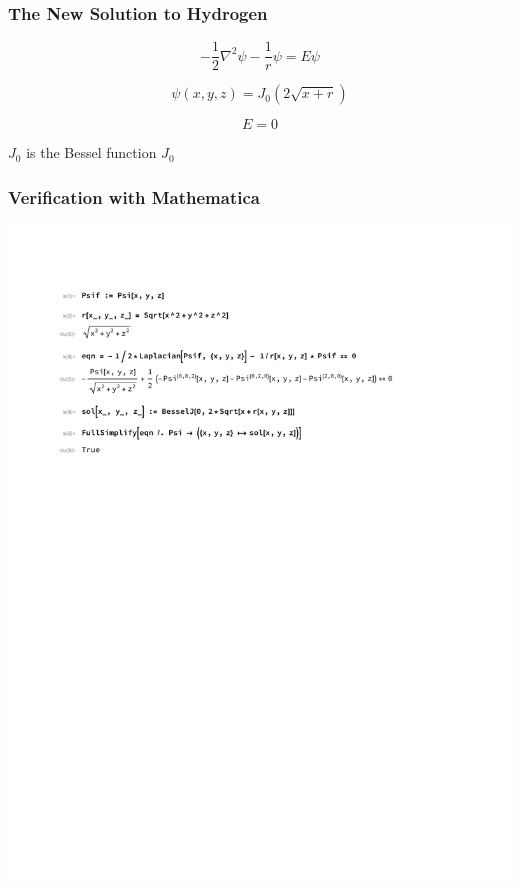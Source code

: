 \documentclass{beamer}
\begin{document}
\begin{frame}
\frametitle{The New Solution to Hydrogen}

\[ - \frac{1}{2} \nabla^2 \psi - \frac{1}{r} \psi = E \psi \]

\[ \psi(x,y,z) = J_0(2\sqrt{x+r}) \]


\[ E = 0 \]

\vskip 0.5in

$J_0$ is the Bessel function $J_0$

\end{frame}

\begin{frame}
\frametitle{Verification with Mathematica}
\includegraphics[page=1, clip, trim=1in 7in 1in 1in, width=\textwidth]{improved.pdf}
\end{frame}


\end{document}
